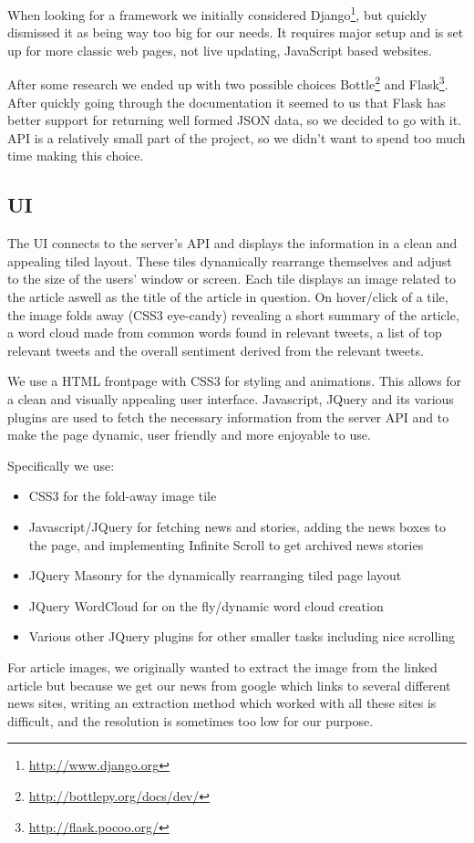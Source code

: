 \documentclass{report}
\begin{document}
		When looking for a framework we initially considered Django\footnote{\url{http://www.django.org}}, but quickly dismissed it as being way too big for our needs. It requires major setup and is set up for more classic web pages, not live updating, JavaScript based websites.
		
		After some research we ended up with two possible choices Bottle\footnote{\url{http://bottlepy.org/docs/dev/}} and Flask\footnote{\url{http://flask.pocoo.org/}}. After quickly going through the documentation it seemed to us that Flask has better support for returning well formed JSON data, so we decided to go with it. API is a relatively small part of the project, so we didn't want to spend too much time making this choice.
		
		\subsection{UI}
		The UI connects to the server's API and displays the information in a clean and appealing tiled layout. These tiles dynamically rearrange themselves and adjust to the size of the users' window or screen. Each tile displays an image related to the article aswell as the title of the article in question. On hover/click of a tile, the image folds away (CSS3 eye-candy) revealing a short summary of the article, a word cloud made from common words found in relevant tweets, a list of top relevant tweets and the overall sentiment derived from the relevant tweets.

    We use a HTML frontpage with CSS3 for styling and animations. This allows for a clean and visually appealing user interface. Javascript, JQuery and its various plugins are used to fetch the necessary information from the server API and to make the page dynamic, user friendly and more enjoyable to use.

Specifically we use:
  \begin{itemize}
    \item CSS3 for the fold-away image tile
    \item Javascript/JQuery for fetching news and stories, adding the news boxes to the page, and implementing Infinite Scroll  to get archived news stories
    \item JQuery Masonry for the dynamically rearranging tiled page layout
    \item JQuery WordCloud for on the fly/dynamic word cloud creation
    \item Various other JQuery plugins for other smaller tasks including nice scrolling
  \end{itemize}
    For article images, we originally wanted to extract the image from the linked article but because we get our news from google which links to several different news sites, writing an extraction method which worked with all these sites is difficult, and the resolution is sometimes too low for our purpose.
    
\end{document}
